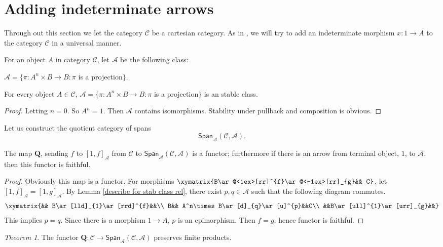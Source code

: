 \documentclass{tac}
\theoremstyle{definition}
\theoremstyle{remark}
\def\mc#1{\mathcal {#1}}
\def\C{\mc C}
\def\A{\mc A}
\newtheorem{theorem}{Theorem}
\begin{document}
\section{Adding indeterminate arrows}
Through out this section we let the category $\C$ be a cartesian category.
As in \cite{lambscot}, we will try to add an indeterminate morphism $x:1\rightarrow A$ to the category $\C$ in a universal manner.

For an object $A$ in category $\C$, let $\A$ be the following class:
\begin{center}
	$\A=\lbrace \pi:A^n\times B\rightarrow B: \pi$ is a projection$\rbrace$.
\end{center}
\begin{lemma}
	For every object $A\in\C$, $\A=\lbrace \pi:A^n\times B\rightarrow B: \pi$ is a projection$\rbrace$ is an stable class.
\end{lemma}
\begin{proof}
	Letting $n=0$. So $A^n=1$. Then $\A$ contains isomorphisms.
	Stability under pullback and composition is obvious.
\end{proof}
Let us construct the quotient category of spans
$$\mathsf{Span}_\A(\C,\A).$$
\begin{proposition}
	The map $\mathbf Q$, sending $f$ to $[1,f]_\A$ from $\C$ to $\mathsf{Span}_\A(\C,\A)$ is a functor; furthermore if there is an arrow from terminal object, $1$, to $\A$, then this functor is faithful.
\end{proposition}
\begin{proof}
	Obviously this map is a functor. For morphisms $\xymatrix{B\ar@<1ex>[rr]^{f}\ar@<-1ex>[rr]_{g}&& C}$, let $[1,f]_\A=[1,g]_\A$. By Lemma \ref{describe for stab class rel}, there exist $p,q\in\A$ such that the following diagram commutes.
		$$\xymatrix{&& B\ar[lld]_{1}\ar[rrd]^{f}&&\\
		B&& A^n\times B\ar[d]_{q}\ar[u]^{p}&&C\\
		&&B\ar[ull]^{1}\ar[urr]_{g}&&}$$
	This implies $p=q$. Since there is a morphism $1\rightarrow A$, $p$ is an epimorphism. Then $f=g$, hence functor is faithful.
\end{proof}
\begin{theorem}
	The functor $\mathbf Q:\C\rightarrow \mathsf{Span}_\A(\C,\A)$ preserves finite products.
\end{theorem}
\end{document}
